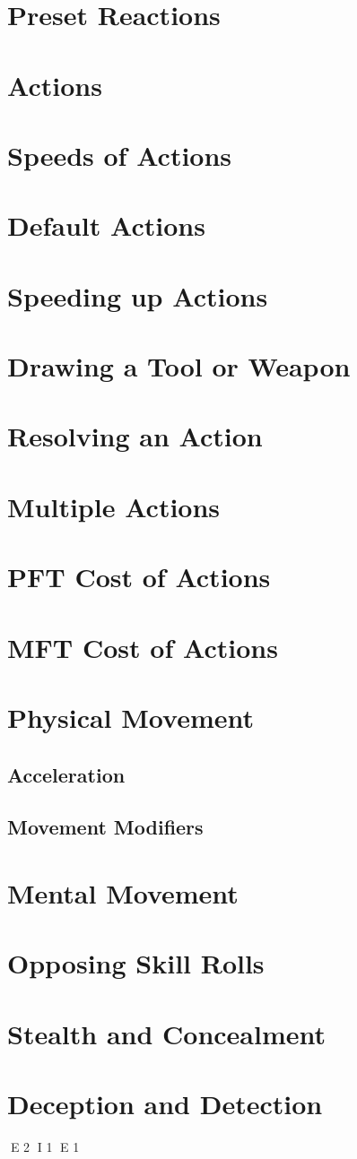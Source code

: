 \section{Preset Reactions}
\section{Actions}
\section{Speeds of Actions}
\section{Default Actions}
\section{Speeding up Actions}
\section{Drawing a Tool or Weapon}
\section{Resolving an Action}
\section{Multiple Actions}
\section{PFT Cost of Actions}
\section{MFT Cost of Actions}
\section{Physical Movement}
\subsection{Acceleration}
\subsection{Movement Modifiers}
\section{Mental Movement}
\section{Opposing Skill Rolls}
\section{Stealth and Concealment}
\section{Deception and Detection}
E 2
I 1
E 1

